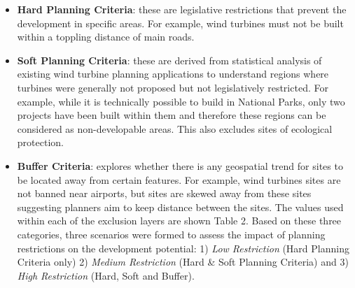 \documentclass[a4paper,]{article}
\providecommand{\tightlist}{%
  \setlength{\itemsep}{0pt}\setlength{\parskip}{0pt}}
\theoremstyle{definition}
\theoremstyle{definition}
\theoremstyle{remark}
\begin{document}
{\begin{itemize}
\tightlist
\item
  \textbf{Hard Planning Criteria}: these are legislative restrictions
  that prevent the development in specific areas. For example, wind
  turbines must not be built within a toppling distance of main roads.
\item
  \textbf{Soft Planning Criteria}: these are derived from statistical
  analysis of existing wind turbine planning applications to understand
  regions where turbines were generally not proposed but not
  legislatively restricted. For example, while it is technically
  possible to build in National Parks, only two projects have been built
  within them and therefore these regions can be considered as
  non-developable areas. This also excludes sites of ecological
  protection.
\item
  \textbf{Buffer Criteria}: explores whether there is any geospatial
  trend for sites to be located away from certain features. For example,
  wind turbines sites are not banned near airports, but sites are skewed
  away from these sites suggesting planners aim to keep distance between
  the sites. The values used within each of the exclusion layers are
  shown Table 2. Based on these three categories, three scenarios were
  formed to assess the impact of planning restrictions on the
  development potential: 1) \emph{Low Restriction} (Hard Planning
  Criteria only) 2) \emph{Medium Restriction} (Hard \& Soft Planning
  Criteria) and 3) \emph{High Restriction} (Hard, Soft and Buffer).
\end{itemize}

\begin{table}


\end{table}}
\end{document}
